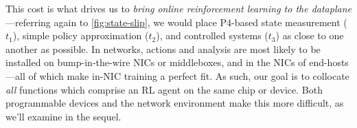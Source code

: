 \documentclass[
conference
,10pt
]{IEEEtran}
\begin{document}
%				
%				
%				
%				
%				
%				
%				
%				


This cost is what drives us to \emph{bring online reinforcement learning to the dataplane}---referring again to \cref{fig:state-slip}, we would place P4-based state measurement ($t_1$), simple policy approximation ($t_2$), and controlled systems ($t_3$) as close to one another as possible.
In networks, actions and analysis are most likely to be installed on bump-in-the-wire NICs or middleboxes, and in the NICs of end-hosts---all of which make in-NIC training a perfect fit.
As such, our goal is to collocate \emph{all} functions which comprise an RL agent on the same chip or device.
Both programmable devices and the network environment make this more difficult, as we'll examine in the sequel.
\end{document}
